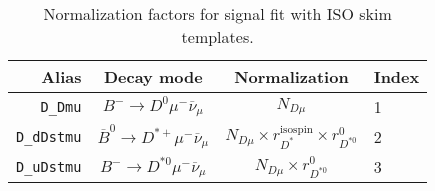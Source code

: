 


\begin{landscape}
\begin{table}
\centering
\caption{
    Normalization factors for \Dz signal fit with ISO skim templates.
}
\label{tab:fit-norm-fact-d0}
\scriptsize

\begin{tabular}{r|c|c|l}
\toprule
           \textbf{Alias} &                                 \textbf{Decay mode}                                  &                                                                                                                                                                                  \textbf{Normalization}                                                                                                                                                                                  & \textbf{Index}   \\
\midrule
          \texttt{D\_Dmu} &                    $B^- \rightarrow D^0 \mu^- \overline{\nu}_\mu$                    &                                                                                                                                                                                       $N_{D \mu}$                                                                                                                                                                                        & 1                \\
       \texttt{D\_dDstmu} &             $\overline{B}^0 \rightarrow D^{*+} \mu^- \overline{\nu}_\mu$             &                                                                                                                                                             $N_{D \mu} \times r_{D^*}^\text{isospin} \times r_{D^{*0}}^{0}$                                                                                                                                                              & 2                \\
       \texttt{D\_uDstmu} &                  $B^- \rightarrow D^{*0} \mu^- \overline{\nu}_\mu$                   &                                                                                                                                                                            $N_{D \mu} \times r_{D^{*0}}^{0}$                                                                                                                                                                             & 3                \\

\end{tabular}
\end{table}
\end{landscape}
